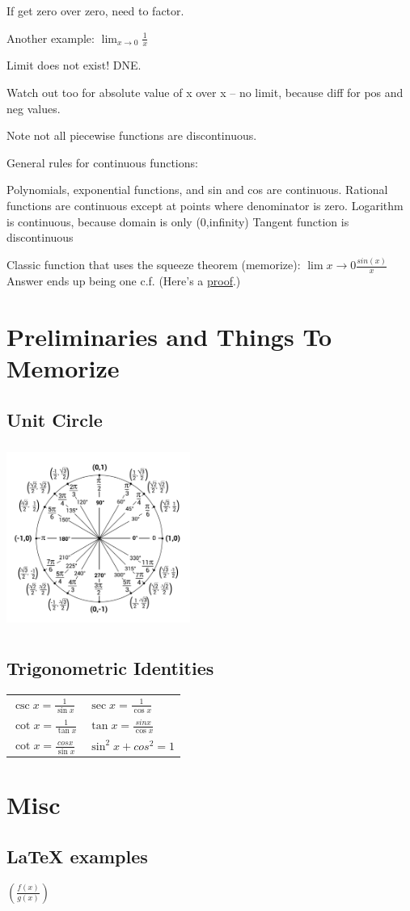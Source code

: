 \documentclass[12pt, letterpaper]{article}
\newcommand\T{\rule{0pt}{8mm}}       %
\begin{document}
If get zero over zero, need to factor.

\vspace{5mm}

Another example: \(
    \lim_{x \to 0}\frac{1}{x}
\)

\vspace{5mm}
Limit does not exist!  DNE.

Watch out too for absolute value of x over x -- no limit, because diff for pos and neg values.

Note not all piecewise functions are discontinuous.

General rules for continuous functions:

Polynomials, exponential functions, and sin and cos are continuous.
Rational functions are continuous except at points where denominator is zero.
Logarithm is continuous, because domain is only (0,infinity)
Tangent function is discontinuous

\vspace{1cm}
Classic function that uses the squeeze theorem (memorize):
\(\lim{x \to 0}\frac{sin(x)}{x}\)
Answer ends up being one c.f. (Here's a \href{http://ime.math.arizona.edu/g-teams/Profiles/JS/Calc/SqueezeTheorem.pdf}{proof}.)
\section{Preliminaries and Things To Memorize}
\subsection{Unit Circle}
\includegraphics[width=6cm, height=6cm]{unit-circle.png}
\subsection{Trigonometric Identities}

\begin{center}
    \begin{tabular}{  p{5cm}  p{5cm} }
        $\csc x = \frac{1}{\sin x }$ & 
        $\sec x = \frac{1}{\cos x }$ \T \\
        
        $\cot x = \frac{1}{\tan x }$ & 
        $\tan x = \frac{sin x}{\cos x }$ \T \\
        $\cot x = \frac{cos x}{\sin x }$ & 
        $\sin^2 x + cos^2 = 1$ \T \\

\end{tabular}
\end{center}
\vspace{1cm}
\section{Misc}
\subsection{LaTeX examples}
$(\frac{f(x)}{g(x)})$
\end{document}
